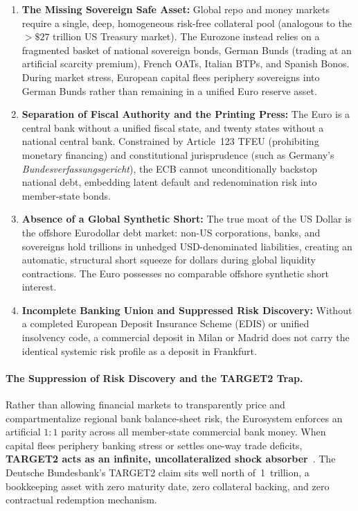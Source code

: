 \documentclass[a4paper,11pt,twoside,parskip=half-,headings=small]{scrartcl}
\newcommand{\EUR}[1]{\texteuro\,#1}
\begin{document}
\begin{enumerate}[nosep]
  \item \textbf{The Missing Sovereign Safe Asset:} Global repo and money markets require a single, deep, homogeneous risk-free collateral pool (analogous to the $>\$27\text{ trillion}$ US Treasury market). The Eurozone instead relies on a fragmented basket of national sovereign bonds, German Bunds (trading at an artificial scarcity premium), French OATs, Italian BTPs, and Spanish Bonos. During market stress, European capital flees periphery sovereigns into German Bunds rather than remaining in a unified Euro reserve asset.
  \item \textbf{Separation of Fiscal Authority and the Printing Press:} The Euro is a central bank without a unified fiscal state, and twenty states without a national central bank. Constrained by Article~123 TFEU (prohibiting monetary financing) and constitutional jurisprudence (such as Germany's \emph{Bundesverfassungsgericht}), the ECB cannot unconditionally backstop national debt, embedding latent default and redenomination risk into member-state bonds.
  \item \textbf{Absence of a Global Synthetic Short:} The true moat of the US Dollar is the offshore Eurodollar debt market: non-US corporations, banks, and sovereigns hold trillions in unhedged USD-denominated liabilities, creating an automatic, structural short squeeze for dollars during global liquidity contractions. The Euro possesses no comparable offshore synthetic short interest.
  \item \textbf{Incomplete Banking Union and Suppressed Risk Discovery:} Without a completed European Deposit Insurance Scheme (EDIS) or unified insolvency code, a commercial deposit in Milan or Madrid does not carry the identical systemic risk profile as a deposit in Frankfurt.
\end{enumerate}

\paragraph{The Suppression of Risk Discovery and the TARGET2 Trap.}
Rather than allowing financial markets to transparently price and compartmentalize regional bank balance-sheet risk, the Eurosystem enforces an artificial $1:1$ parity across all member-state commercial bank money. When capital flees periphery banking stress or settles one-way trade deficits, \textbf{TARGET2 acts as an infinite, uncollateralized shock absorber}~\cite{sinn2012target}. The Deutsche Bundesbank's TARGET2 claim sits well north of \EUR{1~trillion}, a bookkeeping asset with zero maturity date, zero collateral backing, and zero contractual redemption mechanism.
\end{document}
